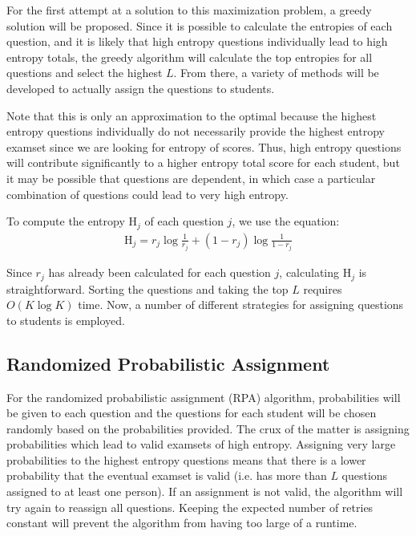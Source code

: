 \documentclass[psamsfonts]{amsart}
\begin{document}
For the first attempt at a solution to this maximization problem, a greedy solution will be proposed. Since it is possible to calculate the entropies of each question, and it is likely that high entropy questions individually lead to high entropy totals, the greedy algorithm will calculate the top entropies for all questions and select the highest $L$. From there, a variety of methods will be developed to actually assign the questions to students. 

Note that this is only an approximation to the optimal because the highest entropy questions individually do not necessarily provide the highest entropy examset since we are looking for entropy of scores. Thus, high entropy questions will contribute significantly to a higher entropy total score for each student, but it may be possible that questions are dependent, in which case a particular combination of questions could lead to very high entropy. 

To compute the entropy $\mathrm{H}_j$ of each question $j$, we use the equation:
\begin{eqnarray}
\mathrm{H}_j = r_j \log \frac{1}{r_j} + (1 - r_j) \log \frac{1}{1 - r_j}
\end{eqnarray}

Since $r_j$ has already been calculated for each question $j$, calculating $\mathrm{H}_j$ is straightforward. Sorting the questions and taking the top $L$ requires $O(K \log K)$ time. Now, a number of different strategies for assigning questions to students is employed.

\subsection{Randomized Probabilistic Assignment}

For the randomized probabilistic assignment (RPA) algorithm, probabilities will be given to each question and the questions for each student will be chosen randomly based on the probabilities provided. The crux of the matter is assigning probabilities which lead to valid examsets of high entropy. Assigning very large probabilities to the highest entropy questions means that there is a lower probability that the eventual examset is valid (i.e. has more than $L$ questions assigned to at least one person). If an assignment is not valid, the algorithm will try again to reassign all questions. Keeping the expected number of retries constant will prevent the algorithm from having too large of a runtime. 
\end{document}
